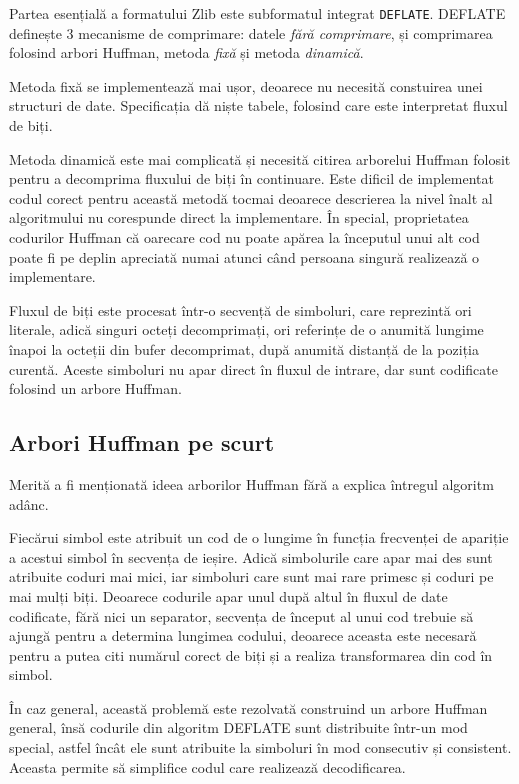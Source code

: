 \documentclass[a4paper,12pt]{report}
\begin{document}
Partea esențială a formatului Zlib este subformatul integrat \texttt{DEFLATE}.
DEFLATE definește 3 mecanisme de comprimare: datele \textit{fără comprimare},
și comprimarea folosind arbori Huffman, metoda \textit{fixă} și metoda \textit{dinamică}.

Metoda fixă se implementează mai ușor, deoarece nu necesită constuirea unei structuri de date.
Specificația dă niște tabele, folosind care este interpretat fluxul de biți.

Metoda dinamică este mai complicată și necesită citirea arborelui Huffman
folosit pentru a decomprima fluxului de biți în continuare.
Este dificil de implementat codul corect pentru această metodă tocmai deoarece descrierea
la nivel înalt al algoritmului nu corespunde direct la implementare.
În special, proprietatea codurilor Huffman că oarecare cod nu poate apărea
la începutul unui alt cod poate fi pe deplin apreciată numai atunci
când persoana singură realizează o implementare.

Fluxul de biți este procesat într-o secvență de simboluri,
care reprezintă ori literale, adică singuri octeți decomprimați,
ori referințe de o anumită lungime înapoi la octeții din bufer decomprimat,
după anumită distanță de la poziția curentă.
Aceste simboluri nu apar direct în fluxul de intrare,
dar sunt codificate folosind un arbore Huffman.

\subsection{Arbori Huffman pe scurt}

Merită a fi menționată ideea arborilor Huffman fără a explica întregul algoritm adânc.

Fiecărui simbol este atribuit un cod de o lungime în funcția frecvenței de apariție a acestui simbol
în secvența de ieșire.
Adică simbolurile care apar mai des sunt atribuite coduri mai mici,
iar simboluri care sunt mai rare primesc și coduri pe mai mulți biți.
Deoarece codurile apar unul după altul în fluxul de date codificate,
fără nici un separator, secvența de început al unui cod trebuie să ajungă pentru a determina lungimea codului,
deoarece aceasta este necesară pentru a putea citi numărul corect de biți și a realiza transformarea din cod în simbol.

În caz general, această problemă este rezolvată construind un arbore Huffman general,
însă codurile din algoritm DEFLATE sunt distribuite într-un mod special,
astfel încât ele sunt atribuite la simboluri în mod consecutiv și consistent.
Aceasta permite să simplifice codul care realizează decodificarea.
\end{document}
